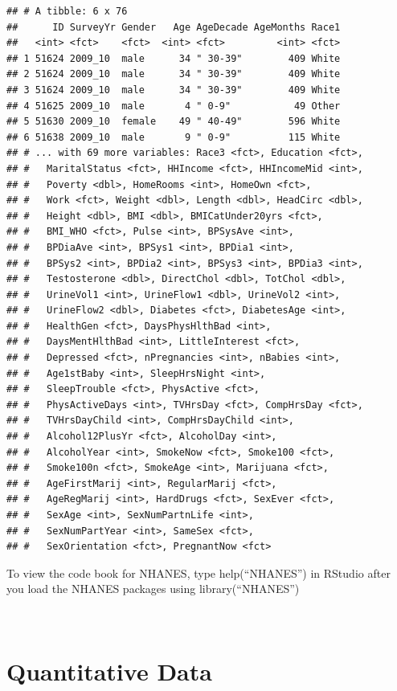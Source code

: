 \documentclass[
]{book}
\begin{document}
\begin{verbatim}
## # A tibble: 6 x 76
##      ID SurveyYr Gender   Age AgeDecade AgeMonths Race1
##   <int> <fct>    <fct>  <int> <fct>         <int> <fct>
## 1 51624 2009_10  male      34 " 30-39"        409 White
## 2 51624 2009_10  male      34 " 30-39"        409 White
## 3 51624 2009_10  male      34 " 30-39"        409 White
## 4 51625 2009_10  male       4 " 0-9"           49 Other
## 5 51630 2009_10  female    49 " 40-49"        596 White
## 6 51638 2009_10  male       9 " 0-9"          115 White
## # ... with 69 more variables: Race3 <fct>, Education <fct>,
## #   MaritalStatus <fct>, HHIncome <fct>, HHIncomeMid <int>,
## #   Poverty <dbl>, HomeRooms <int>, HomeOwn <fct>,
## #   Work <fct>, Weight <dbl>, Length <dbl>, HeadCirc <dbl>,
## #   Height <dbl>, BMI <dbl>, BMICatUnder20yrs <fct>,
## #   BMI_WHO <fct>, Pulse <int>, BPSysAve <int>,
## #   BPDiaAve <int>, BPSys1 <int>, BPDia1 <int>,
## #   BPSys2 <int>, BPDia2 <int>, BPSys3 <int>, BPDia3 <int>,
## #   Testosterone <dbl>, DirectChol <dbl>, TotChol <dbl>,
## #   UrineVol1 <int>, UrineFlow1 <dbl>, UrineVol2 <int>,
## #   UrineFlow2 <dbl>, Diabetes <fct>, DiabetesAge <int>,
## #   HealthGen <fct>, DaysPhysHlthBad <int>,
## #   DaysMentHlthBad <int>, LittleInterest <fct>,
## #   Depressed <fct>, nPregnancies <int>, nBabies <int>,
## #   Age1stBaby <int>, SleepHrsNight <int>,
## #   SleepTrouble <fct>, PhysActive <fct>,
## #   PhysActiveDays <int>, TVHrsDay <fct>, CompHrsDay <fct>,
## #   TVHrsDayChild <int>, CompHrsDayChild <int>,
## #   Alcohol12PlusYr <fct>, AlcoholDay <int>,
## #   AlcoholYear <int>, SmokeNow <fct>, Smoke100 <fct>,
## #   Smoke100n <fct>, SmokeAge <int>, Marijuana <fct>,
## #   AgeFirstMarij <int>, RegularMarij <fct>,
## #   AgeRegMarij <int>, HardDrugs <fct>, SexEver <fct>,
## #   SexAge <int>, SexNumPartnLife <int>,
## #   SexNumPartYear <int>, SameSex <fct>,
## #   SexOrientation <fct>, PregnantNow <fct>
\end{verbatim}

To view the code book for NHANES, type help(``NHANES'') in RStudio after you load the NHANES packages using library(``NHANES'')

\emph{\\
}

\hypertarget{quantitative-data}{%
\section{Quantitative Data}\label{quantitative-data}}
\end{document}
